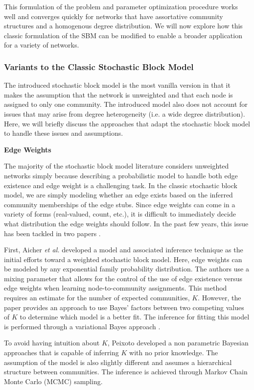 This formulation of the problem and parameter optimization procedure works well and converges quickly for networks that have assortative community structures and a homogenous degree distribution. We will now explore how this classic formulation of the SBM can be modified to enable a broader application for a variety of networks.

\subsubsection{Variants to the Classic Stochastic Block Model}

The introduced stochastic block model is the most vanilla version in that it makes the assumption that the network is unweighted and that each node is assigned to only one community. The introduced model also does not account for issues that may arise from degree heterogeneity (i.e. a wide degree distribution).  Here, we will briefly discuss the approaches that adapt the stochastic block model to handle these issues and assumptions. 

{\bf Edge Weights}

\indent The majority of the stochastic block model literature considers unweighted networks simply because describing a probabilistic model to handle both edge existence and edge weight is a challenging task. In the classic stochastic block model, we are simply modeling whether an edge exists based on the inferred community memberships of the edge stubs. Since edge weights can come in a variety of forms (real-valued, count, etc.), it is difficult to immediately decide what distribution the edge weights should follow. In the past few years, this issue has been tackled in two papers \cite{aicher,peix}.

\indent First, Aicher \emph{et al.} developed a model and associated inference technique as the initial efforts toward a weighted stochastic block model. Here, edge weights can be modeled by any exponential family probability distribution. The authors use a mixing parameter that allows for the control of the use of edge existence versus edge weights when learning node-to-community assignments. This method requires an estimate for the number of expected communities, $K$. However, the paper provides an approach to use Bayes' factors between two competing values of $K$ to determine which model is a better fit. The inference for fitting this model is performed through a variational Bayes approach \cite{vBayes}.

\indent To avoid having intuition about $K$, Peixoto \cite{peix} developed a non parametric Bayesian approaches that is capable of inferring $K$ with no prior knowledge. The assumption of the model is also slightly different and assumes a hierarchical structure between communities. The inference is achieved through Markov Chain Monte Carlo (MCMC) sampling. 

